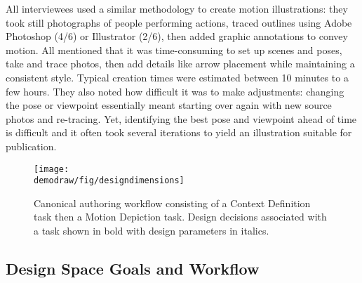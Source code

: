 %
All interviewees used a similar methodology to create motion illustrations: they took still photographs of people performing actions, traced outlines using Adobe Photoshop (4/6) or Illustrator (2/6), then added graphic annotations to convey motion. %
%
All mentioned that it was time-consuming to set up scenes and poses, take and trace photos, then add details like arrow placement while maintaining a consistent style. Typical creation times were estimated between 10 minutes to a few hours.
They also noted how difficult it was to make adjustments: changing the pose or viewpoint essentially meant starting over again with new source photos and re-tracing.
Yet, identifying the best pose and viewpoint ahead of time is difficult and it often took several iterations to yield an illustration suitable for publication.

\begin{figure}[t]
  \centering
  \texttt{[image: \\demodraw/fig/designdimensions]}
  \caption{Canonical authoring workflow consisting of a Context Definition task then a Motion Depiction task. Design decisions associated with a task shown in bold with design parameters in italics.}
  \label{fig:designspace}
\end{figure}

\subsection{Design Space Goals and Workflow}

